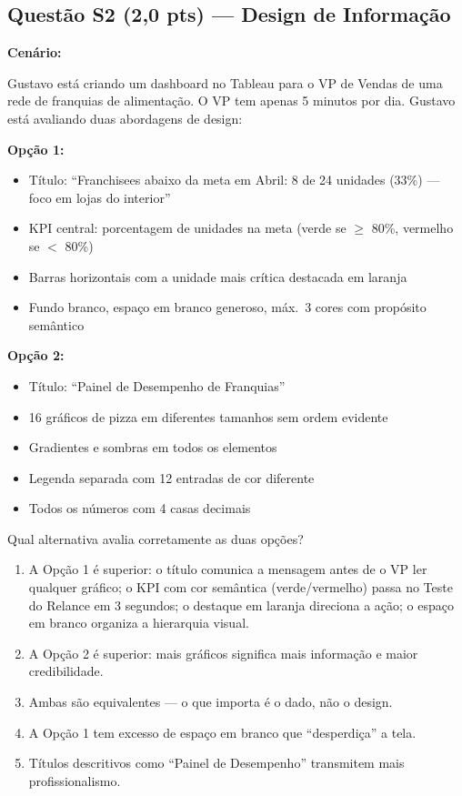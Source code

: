 \subsection*{Questão S2 (2,0 pts) — Design de Informação}

\begin{SolvedBox}
\textbf{Cenário:}

Gustavo está criando um dashboard no Tableau para o VP de Vendas de uma rede de
franquias de alimentação. O VP tem apenas 5 minutos por dia. Gustavo está avaliando
duas abordagens de design:

\textbf{Opção 1:}
\begin{itemize}
  \item Título: ``Franchisees abaixo da meta em Abril: 8 de 24 unidades (33\%) —
  foco em lojas do interior''
  \item KPI central: porcentagem de unidades na meta (verde se $\geq$ 80\%, vermelho se $<$ 80\%)
  \item Barras horizontais com a unidade mais crítica destacada em laranja
  \item Fundo branco, espaço em branco generoso, máx.\ 3 cores com propósito semântico
\end{itemize}

\textbf{Opção 2:}
\begin{itemize}
  \item Título: ``Painel de Desempenho de Franquias''
  \item 16 gráficos de pizza em diferentes tamanhos sem ordem evidente
  \item Gradientes e sombras em todos os elementos
  \item Legenda separada com 12 entradas de cor diferente
  \item Todos os números com 4 casas decimais
\end{itemize}

Qual alternativa avalia corretamente as duas opções?

\begin{enumerate}[label=\Alph*)]
  \item A Opção 1 é superior: o título comunica a mensagem antes de o VP ler qualquer
  gráfico; o KPI com cor semântica (verde/vermelho) passa no Teste do Relance em 3
  segundos; o destaque em laranja direciona a ação; o espaço em branco organiza a
  hierarquia visual.
  \item A Opção 2 é superior: mais gráficos significa mais informação e maior credibilidade.
  \item Ambas são equivalentes — o que importa é o dado, não o design.
  \item A Opção 1 tem excesso de espaço em branco que ``desperdiça'' a tela.
  \item Títulos descritivos como ``Painel de Desempenho'' transmitem mais profissionalismo.
\end{enumerate}


\end{SolvedBox}
